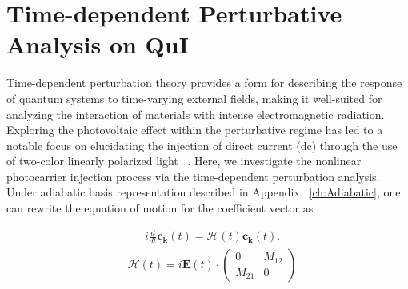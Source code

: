\section{Time-dependent Perturbative Analysis on QuI \label{sec:deriveperturbation}}
Time-dependent perturbation theory provides a form for describing the response of quantum systems to time-varying external fields, making it well-suited for analyzing the interaction of materials with intense electromagnetic radiation. 
Exploring the photovoltaic effect within the perturbative regime has led to a notable focus on elucidating the injection of direct current (dc) through the use of two-color linearly polarized light ~\cite{PhysRevLett.74.3596,PhysRevLett.76.1703,PhysRevLett.78.306,Sun2010,PhysRevB.100.075202,HeideBoolakeeEcksteinHommelhoff+2021+3701+3707,PhysRevLett.123.067402}. 
Here, we investigate the nonlinear photocarrier injection process via the time-dependent perturbation analysis.
Under adiabatic basis representation described in Appendix ~\ref{ch:Adiabatic}, one can rewrite the equation of motion for the coefficient vector as

\begin{align}
&i\frac{d}{dt} \mathbf c_{\mathbf k}(t) = \mathcal{H}(t) \mathbf c_{\mathbf k}(t).
	\label{eq:tdse-ad-basis}
\end{align}
\begin{align}
&\mathcal{H}(t)= 
 i\mathbf E(t)\cdot \left(
    \begin{array}{cc}
        0 & M_{12}\\
        M_{21} & 0
    \end{array}
    \right)
\end{align}

